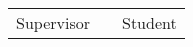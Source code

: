 \documentclass[12pt]{scrartcl}
\begin{document}
\newpage
{%
\renewcommand{\bibfont}{\normalfont\small}
\setlength{\biblabelsep}{5pt}
\setlength{\bibitemsep}{0.5\baselineskip plus 0.5\baselineskip} %
\setcounter{biburllcpenalty}{9000}
\setcounter{biburlucpenalty}{9999}
\printbibliography%
}

\null\vfill

\begin{center}
	\begin{tabular}{l p{} r}
		\cline{1-1} \cline{3-3}
		\begin{minipage}[t]{0.4\textwidth}
			\centering
			\vspace{0cm}Supervisor
		\end{minipage}
		&
		\begin{minipage}[t]{0.2\textwidth}
		\end{minipage}
		&
		\begin{minipage}[t]{0.4\textwidth}
			\centering
			\vspace{0cm}Student
		\end{minipage}
	\end{tabular}
\end{center}
\end{document}

